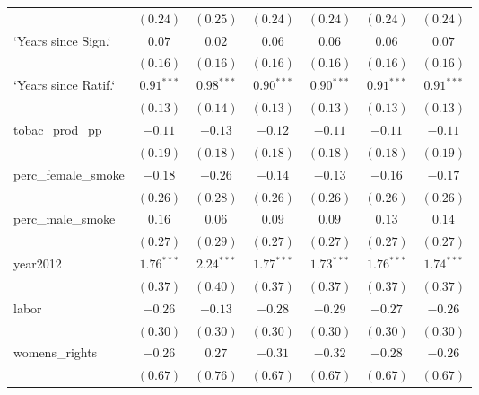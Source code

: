 \begin{table}[!h]
\begin{center}
\begin{tabular}{l c c c c c c }
                        & $(0.24)$     & $(0.25)$     & $(0.24)$     & $(0.24)$     & $(0.24)$     & $(0.24)$     \\
`Years since Sign.`     & $0.07$       & $0.02$       & $0.06$       & $0.06$       & $0.06$       & $0.07$       \\
                        & $(0.16)$     & $(0.16)$     & $(0.16)$     & $(0.16)$     & $(0.16)$     & $(0.16)$     \\
`Years since Ratif.`    & $0.91^{***}$ & $0.98^{***}$ & $0.90^{***}$ & $0.90^{***}$ & $0.91^{***}$ & $0.91^{***}$ \\
                        & $(0.13)$     & $(0.14)$     & $(0.13)$     & $(0.13)$     & $(0.13)$     & $(0.13)$     \\
tobac\_prod\_pp         & $-0.11$      & $-0.13$      & $-0.12$      & $-0.11$      & $-0.11$      & $-0.11$      \\
                        & $(0.19)$     & $(0.18)$     & $(0.18)$     & $(0.18)$     & $(0.18)$     & $(0.19)$     \\
perc\_female\_smoke     & $-0.18$      & $-0.26$      & $-0.14$      & $-0.13$      & $-0.16$      & $-0.17$      \\
                        & $(0.26)$     & $(0.28)$     & $(0.26)$     & $(0.26)$     & $(0.26)$     & $(0.26)$     \\
perc\_male\_smoke       & $0.16$       & $0.06$       & $0.09$       & $0.09$       & $0.13$       & $0.14$       \\
                        & $(0.27)$     & $(0.29)$     & $(0.27)$     & $(0.27)$     & $(0.27)$     & $(0.27)$     \\
year2012                & $1.76^{***}$ & $2.24^{***}$ & $1.77^{***}$ & $1.73^{***}$ & $1.76^{***}$ & $1.74^{***}$ \\
                        & $(0.37)$     & $(0.40)$     & $(0.37)$     & $(0.37)$     & $(0.37)$     & $(0.37)$     \\
labor                   & $-0.26$      & $-0.13$      & $-0.28$      & $-0.29$      & $-0.27$      & $-0.26$      \\
                        & $(0.30)$     & $(0.30)$     & $(0.30)$     & $(0.30)$     & $(0.30)$     & $(0.30)$     \\
womens\_rights          & $-0.26$      & $0.27$       & $-0.31$      & $-0.32$      & $-0.28$      & $-0.26$      \\
                        & $(0.67)$     & $(0.76)$     & $(0.67)$     & $(0.67)$     & $(0.67)$     & $(0.67)$     \\

\end{tabular}
\end{center}
\end{table}
